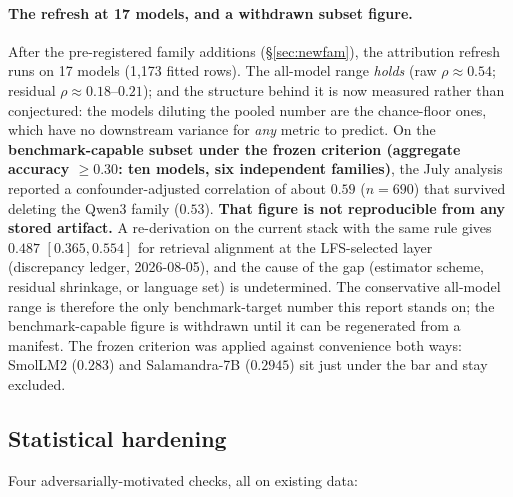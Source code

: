 \documentclass[11pt,a4paper]{article}
\begin{document}
\paragraph{The refresh at 17 models, and a withdrawn subset figure.} After the pre-registered family additions
(\S\ref{sec:newfam}), the attribution refresh runs on 17 models (1{,}173
fitted rows). The all-model range \emph{holds} (raw $\rho \approx 0.54$;
residual $\rho \approx 0.18$--$0.21$); and the structure behind it is now
measured rather than conjectured: the models diluting the pooled number are
the chance-floor ones, which have no downstream variance for \emph{any}
metric to predict. On the \textbf{benchmark-capable subset under the frozen criterion (aggregate
accuracy $\ge 0.30$: ten models, six independent families)}, the July
analysis reported a confounder-adjusted correlation of about $0.59$ ($n = 690$) that
survived deleting the Qwen3 family ($0.53$). \textbf{That figure is not
reproducible from any stored artifact.} A re-derivation on the current
stack with the same rule gives $0.487$ $[0.365, 0.554]$ for retrieval
alignment at the LFS-selected layer (discrepancy ledger, 2026-08-05), and
the cause of the gap (estimator scheme, residual shrinkage, or language set)
is undetermined. The conservative all-model range is therefore the only
benchmark-target number this report stands on; the benchmark-capable figure is
withdrawn until it can be regenerated from a manifest. The frozen criterion
was applied against convenience both ways: SmolLM2 ($0.283$) and
Salamandra-7B ($0.2945$) sit just under the bar and stay excluded.

\subsection{Statistical hardening}
\label{sec:hardening}
Four adversarially-motivated checks, all on existing data:
\end{document}
